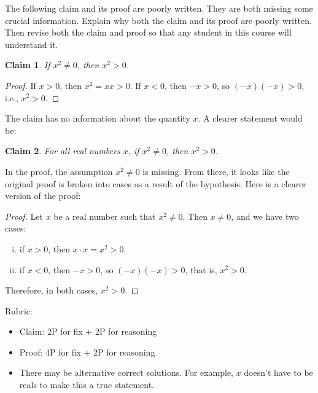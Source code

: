 \documentclass{article}
\newtheorem*{claim}{Claim}
\theoremstyle{definition}
\begin{document}
\begin{question}{10}
   The following claim and its proof are poorly written. They are both missing some crucial information. 
   Explain why both the claim and its proof are poorly written. Then revise both the claim and proof so that any student in this course will understand it. 
      \begin{claim}
       If $x^2\neq 0$, then $x^2>0$.
      \end{claim}
      \begin{proof}
       If $x>0$, then $x^2=xx>0$. If $x<0$, then $-x>0$, so $(-x)(-x)>0$, i.e., $x^2>0$.
      \end{proof}
\end{question}
\begin{solution}
    The claim has no information about the quantity $x$. A clearer statement would be:
        \begin{claim}
           For all real numbers $x$, if $x^2\neq 0$, then $x^2>0$.
        \end{claim}
    In the proof, the assumption $x^2\neq 0$ is missing. 
    From there, it looks like the original proof is broken into cases as a result of the hypothesis. 
    Here is a clearer version of the proof:
        \begin{proof}
           Let $x$ be a real number such that $x^2\neq 0$. Then $x\neq 0$, and we have two cases:
            \begin{enumerate}[i.]
                 \item if $x>0$, then $x\cdot x=x^2>0$.
                 \item if $x<0$, then $-x>0$, so $(-x)(-x)>0$, that is, $x^2>0$.
            \end{enumerate}
           Therefore, in both cases, $x^2>0$.
        \end{proof}

{\color{red} Rubric:
\begin{itemize}
\item Claim: 2P for fix + 2P for reasoning
\item Proof: 4P for fix + 2P for reasoning
\item There may be alternative correct solutions. For example, $x$ doesn't have to be reals to make this a true statement.
\end{itemize}}
\end{solution}
\end{document}
